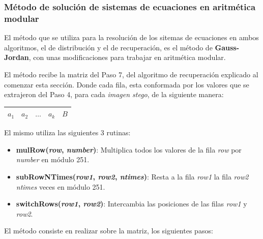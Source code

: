 \documentclass{article}
\begin{document}
\subsubsection{Método de solución de sistemas de ecuaciones en aritmética modular}
\label{section:gauss}

El método que se utiliza para la resolución de los sitemas de ecuaciones en ambos algoritmos, el de distribución y el de recuperación, es
el método de \textbf{Gauss-Jordan}, con unas modificaciones para trabajar en aritmética modular.

El método recibe la matriz del Paso 7, del algoritmo de recuperación explicado al comenzar esta sección. Donde cada fila, esta conformada
por los valores que se extrajeron del Paso 4, para cada \emph{imagen stego}, de la siguiente manera:

\begin{center}
\begin{tabular}{|c | c | c | c | c |}
 \hline
 $a_1$ & $a_2$ & $\dots$ & $a_k$ & $B$ \\
 \hline
\end{tabular} 
\end{center}


El mismo utiliza las siguientes 3 rutinas:
\begin{itemize}
 \item \textbf{mulRow(\emph{row}, \emph{number})}: Multiplica todos los valores de la fila \emph{row} por \emph{number} en módulo 251.
 \item \textbf{subRowNTimes(\emph{row1}, \emph{row2}, \emph{ntimes})}: Resta a la fila \emph{row1} la fila \emph{row2} \emph{ntimes} veces en módulo 251.
 \item \textbf{switchRows(\emph{row1}, \emph{row2})}: Intercambia las posiciones de las filas \emph{row1} y \emph{row2}.
\end{itemize}

\vspace{0.3cm}

El método consiste en realizar sobre la matriz, los siguientes pasos:
\end{document}
